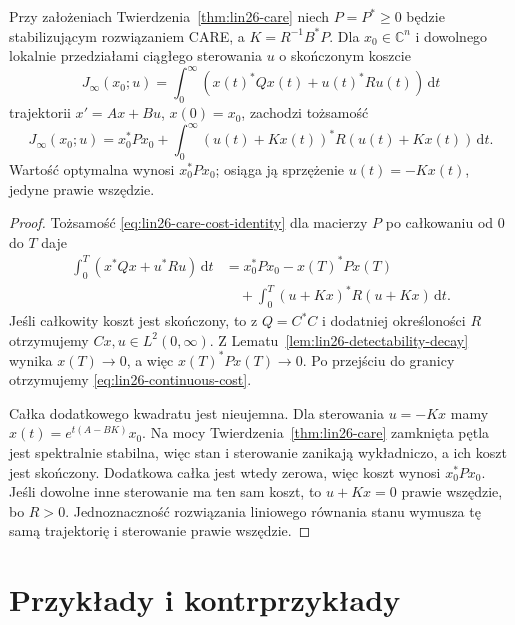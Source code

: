 \begin{twierdzenie}
\label{thm:lin26-care-optimal}
Przy założeniach
Twierdzenia~\ref{thm:lin26-care}
niech \(P=P^*\ge0\)
będzie stabilizującym
rozwiązaniem CARE,
a \(K=R^{-1}B^*P\).
Dla \(x_0\in\mathbb C^n\)
i dowolnego lokalnie
przedziałami ciągłego
sterowania \(u\)
o skończonym koszcie
\[
 J_\infty(x_0;u)=
 \int_0^\infty
  (x(t)^*Qx(t)+u(t)^*Ru(t))
 \,\mathrm dt
\]
trajektorii \(x'=Ax+Bu\),
\(x(0)=x_0\),
zachodzi tożsamość
\[
 J_\infty(x_0;u)
 =x_0^*Px_0+
  \int_0^\infty
        (u(t)+Kx(t))^*R
        (u(t)+Kx(t))
    \,\mathrm dt.
 \tag{26.8}\label{eq:lin26-continuous-cost}
\]
Wartość optymalna wynosi
\(x_0^*Px_0\);
osiąga ją sprzężenie
\(u(t)=-Kx(t)\),
jedyne prawie wszędzie.
\end{twierdzenie}
\begin{proof}
Tożsamość
\eqref{eq:lin26-care-cost-identity}
dla macierzy \(P\)
po całkowaniu od \(0\)
do \(T\) daje
\[
 \begin{aligned}
 \int_0^T(x^*Qx+u^*Ru)\,\mathrm dt
 &=x_0^*Px_0-x(T)^*Px(T)\\
 &\quad+\int_0^T
       (u+Kx)^*R(u+Kx)\,\mathrm dt.
 \end{aligned}
\]
Jeśli całkowity koszt
jest skończony,
to z \(Q=C^*C\)
i dodatniej określoności
\(R\) otrzymujemy
\(Cx,u\in L^2(0,\infty)\).
Z
Lematu~\ref{lem:lin26-detectability-decay}
wynika \(x(T)\to0\),
a więc
\(x(T)^*Px(T)\to0\).
Po przejściu do granicy
otrzymujemy
\eqref{eq:lin26-continuous-cost}.

Całka dodatkowego
kwadratu jest nieujemna.
Dla sterowania
\(u=-Kx\) mamy
\(x(t)=e^{t(A-BK)}x_0\).
Na mocy
Twierdzenia~\ref{thm:lin26-care}
zamknięta pętla
jest spektralnie stabilna,
więc stan i sterowanie
zanikają wykładniczo,
a ich koszt jest skończony.
Dodatkowa całka
jest wtedy zerowa,
więc koszt wynosi
\(x_0^*Px_0\).
Jeśli dowolne inne
sterowanie ma ten sam koszt,
to \(u+Kx=0\)
prawie wszędzie,
bo \(R>0\).
Jednoznaczność rozwiązania
liniowego równania stanu
wymusza tę samą trajektorię
i sterowanie prawie wszędzie.
\end{proof}

\section{Przykłady i kontrprzykłady}
\label{sec:lin26-examples}

